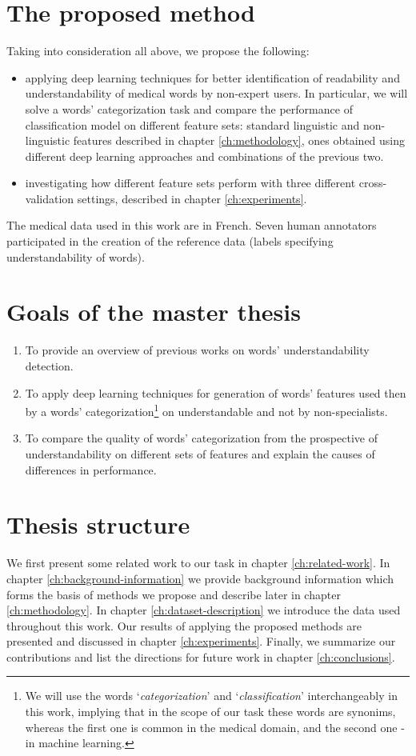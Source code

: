 \section{The proposed method}
Taking into consideration all above, we propose the following:
\begin{itemize}
    \item applying deep learning techniques for better identification of readability and understandability of medical words by non-expert users. In particular, we will solve a words' categorization task and compare the performance of classification model on different feature sets: standard linguistic and non-linguistic features described in chapter \ref{ch:methodology}, ones obtained using different deep learning approaches and combinations of the previous two.
    \item investigating how different feature sets perform with three different cross-validation settings, described in chapter \ref{ch:experiments}. 
\end{itemize}
The medical data used in this work are in French. Seven human annotators participated in the creation of the reference data (labels specifying understandability of words).

\section{Goals of the master thesis}
\begin{enumerate}
    \item To provide an overview of previous works on words' understandability detection.
    \item To apply deep learning techniques for generation of words' features used then by a words' categorization\footnote{We will use the words `\textit{categorization}' and `\textit{classification}' interchangeably in this work, implying that in the scope of our task these words are synonims, whereas the first one is common in the medical domain, and the second one - in machine learning.} on understandable and not by non-specialists.
    \item To compare the quality of words' categorization from the prospective of understandability on different sets of features and explain the causes of differences in performance.
\end{enumerate}

\section{Thesis structure}
We first present some related work to our task in chapter \ref{ch:related-work}. 
In chapter \ref{ch:background-information} we provide background information which forms the basis of methods we propose and describe later in chapter \ref{ch:methodology}. 
In chapter \ref{ch:dataset-description} we introduce the data used throughout this work. 
Our results of applying the proposed methods are presented and discussed in chapter \ref{ch:experiments}. 
Finally, we summarize our contributions and list the directions for future work in chapter \ref{ch:conclusions}.